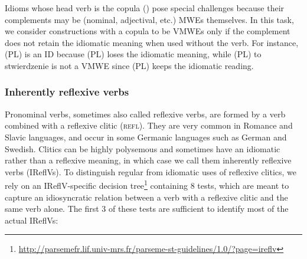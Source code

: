 \documentclass[output=paper,
modfonts,
]{langscibook}
\begin{document}
Idioms whose head verb is the copula () pose special challenges because their complements may be (nominal, adjectival, etc.) MWEs themselves. In this task, we consider constructions with a copula to be VMWEs only if the complement does not retain the idiomatic meaning when used without the verb. For instance, (PL)  is an ID because (PL)  loses the idiomatic meaning, while (PL) to stwierdzenie  is not a VMWE since (PL)  keeps the idiomatic reading.

\subsubsection{Inherently reflexive verbs}
\label{sec:ireflvs}
%
Pronominal verbs, sometimes also called reflexive verbs, are formed by a verb combined with a reflexive clitic (\textsc{refl}). %
They are very common in Romance and Slavic languages, and occur in some Germanic languages such as German and Swedish. Clitics can be highly polysemous and sometimes have an idiomatic rather than a reflexive meaning, in which case we call them inherently reflexive verbs (IReflVs). To distinguish regular from idiomatic uses of reflexive clitics, we rely on an IReflV-specific decision tree\footnote{\url{http://parsemefr.lif.univ-mrs.fr/parseme-st-guidelines/1.0/?page=ireflv}} containing 8 tests, which are meant to capture an idiosyncratic relation between a verb with a reflexive clitic and the same verb alone. The first 3 of these tests are sufficient to identify most of the actual IReflVs:
\end{document}
